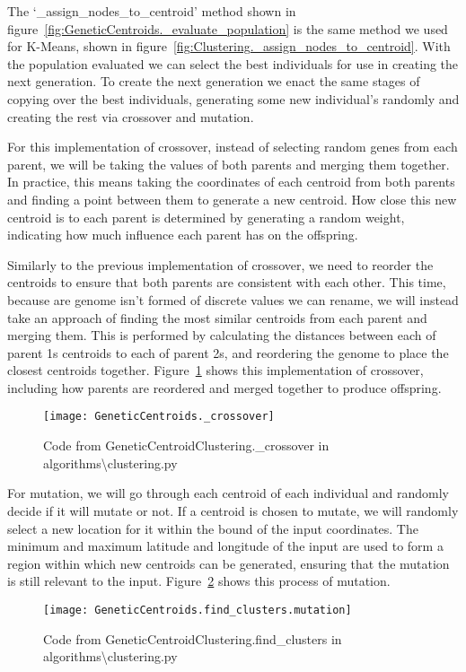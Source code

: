 \noindent
The `\_assign\_nodes\_to\_centroid' method shown in figure~\ref{fig:GeneticCentroids._evaluate_population} is the same
method we used for K-Means, shown in figure~\ref{fig:Clustering._assign_nodes_to_centroid}.
With the population evaluated we can select the best individuals for use in creating the next generation.
To create the next generation we enact the same stages of copying over the best individuals, generating some new
individual's randomly and creating the rest via crossover and mutation.

For this implementation of crossover, instead of selecting random genes from each parent, we will be taking the
values of both parents and merging them together.
In practice, this means taking the coordinates of each centroid from both parents and finding a point between them
to generate a new centroid.
How close this new centroid is to each parent is determined by generating a random weight, indicating how much
influence each parent has on the offspring.

\noindent
Similarly to the previous implementation of crossover, we need to reorder the centroids to ensure that both parents
are consistent with each other.
This time, because are genome isn't formed of discrete values we can rename, we will instead take an approach of
finding the most similar centroids from each parent and merging them.
This is performed by calculating the distances between each of parent 1s centroids to each of parent 2s, and
reordering the genome to place the closest centroids together.
Figure~\ref{fig:GeneticCentroids._crossover} shows this implementation of crossover, including how parents are
reordered and merged together to produce offspring.
\begin{figure}[H]
    \centering
    \texttt{[image: GeneticCentroids.\_crossover]}
    \caption{Code from GeneticCentroidClustering.\_crossover in algorithms\textbackslash clustering.py}
    \label{fig:GeneticCentroids._crossover}
\end{figure}

\noindent
For mutation, we will go through each centroid of each individual and randomly decide if it will mutate or not.
If a centroid is chosen to mutate, we will randomly select a new location for it within the bound of the input
coordinates.
The minimum and maximum latitude and longitude of the input are used to form a region within which new centroids can
be generated, ensuring that the mutation is still relevant to the input.
Figure~\ref{fig:GeneticCentroids.find_clusters.mutation} shows this process of mutation.
\begin{figure}[H]
    \centering
    \texttt{[image: GeneticCentroids.find\_clusters.mutation]}
    \caption{Code from GeneticCentroidClustering.find\_clusters in algorithms\textbackslash clustering.py}
    \label{fig:GeneticCentroids.find_clusters.mutation}
\end{figure}

